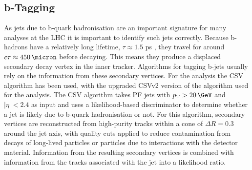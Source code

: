 \subsection{b-Tagging}
\label{sec:objects_jets_btag}
As jets due to b-quark hadronisation are an important signature
for many analyses at the \ac{LHC} it is important to identify such jets correctly.
Because b-hadrons have a relatively long lifetime, $\tau \approx 1.5$ ps \cite{pdg-2014},
they travel for around $c\tau \approx 450\,\micron$ before decaying. This means
they produce a displaced secondary decay vertex in the inner tracker.
Algorithms for tagging b-jets usually rely on the information
from these secondary vertices.
For the \Htohhtobbtautau analysis 
the \ac{CSV} algorithm \cite{cms-btag-paper} has been used, with the upgraded
\ac{CSV}v2 version of the algorithm \cite{cms-btag-run2} used for the \AHtotautau analysis. 
The \ac{CSV} algorithm takes \ac{PF} jets with $\pTm> 20\,\GeV$ and $|\eta|<2.4$ as input and 
uses a likelihood-based discriminator to determine 
whether a jet is likely due to b-quark hadronisation or not.
For this algorithm, secondary vertices are reconstructed from high-purity tracks
within a cone of $\Delta R = 0.3$ around the jet axis, with quality cuts applied
to reduce contamination from decays of long-lived particles or particles due 
to interactions with the detector material. Information from the resulting
secondary vertices is combined with information from the tracks associated
with the jet into a likelihood ratio.

